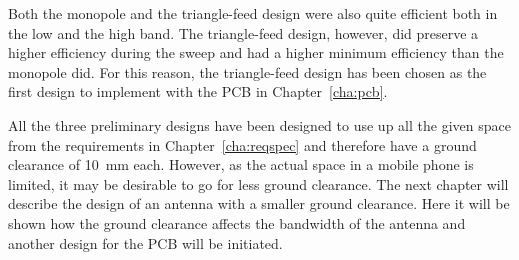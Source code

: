 Both the monopole and the triangle-feed design were also quite efficient both in the low and the high band. The triangle-feed design, however, did preserve a higher efficiency during the sweep and had a higher minimum efficiency than the monopole did. For this reason, the triangle-feed design has been chosen as the first design to implement with the PCB in Chapter~\ref{cha:pcb}.

All the three preliminary designs have been designed to use up all the given space from the requirements in Chapter~\ref{cha:reqspec} and therefore have a ground clearance of \SI{10}{mm} each. However, as the actual space in a mobile phone is limited, it may be desirable to go for less ground clearance. The next chapter will describe the design of an antenna with a smaller ground clearance. Here it will be shown how the ground clearance affects the bandwidth of the antenna and another design for the PCB will be initiated.
